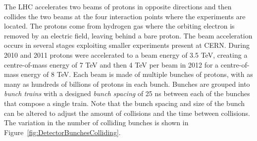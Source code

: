 The LHC accelerates two beams of protons in opposite directions and then collides the two beams at the four interaction points where the experiments are located. The protons come from hydrogen gas where the orbiting electron is removed by an electric field, leaving behind a bare proton. The beam acceleration occurs in several stages exploiting smaller experiments present at CERN. During 2010 and 2011 protons were accelerated to a beam energy of 3.5 TeV, creating a centre-of-mass energy of 7 TeV and then 4 TeV per beam in 2012 for a centre-of-mass energy of 8 TeV. Each beam is made of multiple bunches of protons, with as many as hundreds of billions of protons in each bunch. Bunches are grouped into \textit{bunch trains} with a designed \textit{bunch spacing} of 25 ns between each of the bunches that compose a single train. Note that the bunch spacing and size of the bunch can be altered to adjust the amount of collisions and the time between collisions. The variation in the number of colliding bunches is shown in Figure~\ref{fig:DetectorBunchesColliding}.

